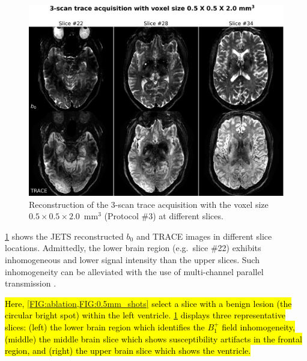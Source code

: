 \documentclass[preprint,12pt,authoryear,review]{elsarticle}
\begin{document}
    \begin{figure}
        \centering
        \includegraphics[width=\textwidth]{../figures/fig8.png}
        \caption{Reconstruction of the 3-scan trace acquisition with
        the voxel size $0.5\times0.5\times2.0$~mm$^3$ (Protocol \#3)
        at different slices.}
        \label{FIG:0.5mm_slice}
    \end{figure}

    \cref{FIG:0.5mm_slice} shows the JETS reconstructed $b_0$
    and TRACE images in different slice locations.
    Admittedly, the lower brain region (e.g.~slice \#22)
    exhibits inhomogeneous and lower signal intensity
    than the upper slices.
    Such inhomogeneity can be alleviated with
    the use of multi-channel parallel transmission
    \citep{katscher_2003_ptx,grissom_2010_ptx}.

    \hl{Here, \mbox{\cref{FIG:ablation,FIG:0.5mm_shots}}
    select a slice with a benign lesion
    (the circular bright spot) within the left ventricle.
    \mbox{\cref{FIG:0.5mm_slice}} displays three representative slices:
    (left) the lower brain region
    which identifies the $B_1^+$ field inhomogeneity,
    (middle) the middle brain slice
    which shows susceptibility artifacts in the frontal region,
    and (right) the upper brain slice which shows the ventricle.}
\end{document}
